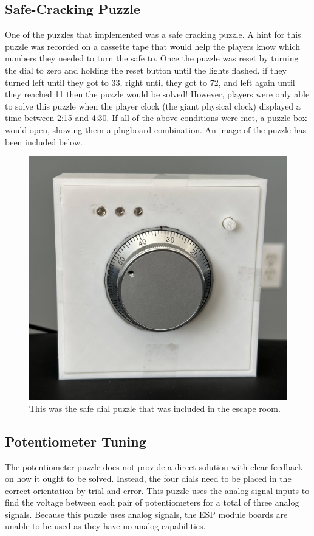 \documentclass[conference]{IEEEtran}
\begin{document}
\subsection{Safe-Cracking Puzzle} %
\indent One of the puzzles that implemented was a safe cracking puzzle. A hint for this puzzle was recorded on a cassette tape
that would help the players know which numbers they needed to turn the safe to. Once the puzzle was reset by turning the dial
to zero and holding the reset button until the lights flashed, if they turned left until they got to 33, right until they got to 72,
and left again until they reached 11 then the puzzle would be solved! However, players were only able to solve this puzzle when the
player clock (the giant physical clock) displayed a time between 2:15 and 4:30. If all of the above conditions were met, a puzzle box
would open, showing them a plugboard combination. An image of the puzzle has been included below.
\begin{figure}[ht]
    \centering
    \includegraphics[width=0.90\columnwidth]{Images/dial.jpg}
    \caption{This was the safe dial puzzle that was included in the escape room.}
    \label{fig:dial}
\end{figure}

\subsection{Potentiometer Tuning} %

\indent The potentiometer puzzle does not provide a direct solution with clear feedback on how it ought to be solved. Instead, 
the four dials need to be placed in the correct orientation by trial and error. This puzzle uses the analog signal inputs 
to find the voltage between each pair of potentiometers for a total of three analog signals. Because this puzzle uses analog 
signals, the ESP module boards are unable to be used as they have no analog capabilities.
\end{document}
